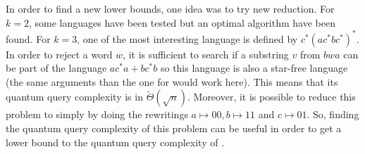 In order to find a new lower bounds, one idea was to try new reduction.
For $k=2$, some languages have been tested but an optimal algorithm
have been found. For $k=3$, one of the most interesting language is defined
by $c^*(ac^*bc^*)^*$.
In order to reject a word $w$, it is sufficient to search if a substring $v$
from $bwa$ can be part of the language $ac^*a+bc^*b$ so this language is also
a star-free language (the same arguments than the one for  would work here).
This means that its quantum query complexity is in $\tilde{\Theta}(\sqrt{n})$.
Moreover, it is possible to reduce this problem to  simply by doing
the rewritings $a \mapsto 00, b\mapsto 11$ and $c \mapsto 01$. So, finding the
quantum query complexity of this problem can be useful in order to get a lower
bound to the quantum query complexity of .